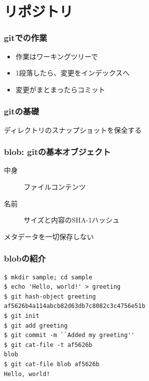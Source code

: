 \section{リポジトリ}

\begin{frame}
  \frametitle{gitでの作業}
  \begin{itemize}
  \item 作業はワーキングツリーで
  \item 1段落したら、変更をインデックスへ
  \item 変更がまとまったらコミット
  \end{itemize}
\end{frame}

\begin{frame}
  \frametitle{gitの基礎}
  \begin{alertblock}{}
    ディレクトリのスナップショットを保全する
  \end{alertblock}
\end{frame}

\begin{frame}
  \frametitle{blob: gitの基本オブジェクト}
  \begin{description}
  \item[中身] ファイルコンテンツ
  \item[名前] サイズと内容のSHA-1ハッシュ
  \end{description}
  \begin{alertblock}{}
    メタデータを一切保存しない
  \end{alertblock}
\end{frame}

\begin{frame}[fragile]
  \frametitle{blobの紹介}
\begin{lstlisting}
$ mkdir sample; cd sample
$ echo 'Hello, world!' > greeting 
$ git hash-object greeting
af5626b4a114abcb82d63db7c8082c3c4756e51b
$ git init
$ git add greeting
$ git commit -m ``Added my greeting''
$ git cat-file -t af5626b
blob
$ git cat-file blob af5626b
Hello, world!
\end{lstlisting}
\end{frame}

